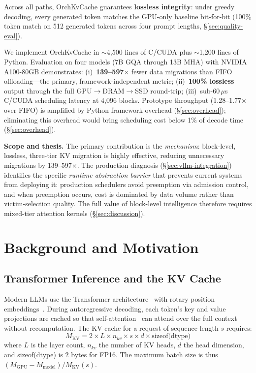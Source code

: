 \documentclass[conference]{IEEEtran}
\begin{document}
Across all paths, OrchKvCache guarantees \textbf{lossless integrity}: under greedy decoding, every generated token matches the GPU-only baseline bit-for-bit (100\% token match on 512 generated tokens across four prompt lengths, \S\ref{sec:quality-eval}).

We implement OrchKvCache in ${\sim}$4,500 lines of C/CUDA plus ${\sim}$1,200 lines of Python. Evaluation on four models (7B GQA through 13B MHA) with NVIDIA A100-80GB demonstrates: (i)~\textbf{139--597$\times$} fewer data migrations than FIFO offloading---the primary, framework-independent metric; (ii)~\textbf{100\% lossless} output through the full GPU$\to$DRAM$\to$SSD round-trip; (iii)~sub-60\,$\mu$s C/CUDA scheduling latency at 4,096 blocks. Prototype throughput (1.28--1.77$\times$ over FIFO) is amplified by Python framework overhead (\S\ref{sec:overhead}); eliminating this overhead would bring scheduling cost below 1\% of decode time (\S\ref{sec:overhead}).

\textbf{Scope and thesis.} The primary contribution is the \emph{mechanism}: block-level, lossless, three-tier KV migration is highly effective, reducing unnecessary migrations by 139--597$\times$. The production diagnosis (\S\ref{sec:vllm-integration}) identifies the specific \emph{runtime abstraction barrier} that prevents current systems from deploying it: production schedulers avoid preemption via admission control, and when preemption occurs, cost is dominated by data volume rather than victim-selection quality. The full value of block-level intelligence therefore requires mixed-tier attention kernels (\S\ref{sec:discussion}).

\section{Background and Motivation}
\subsection{Transformer Inference and the KV Cache}

Modern LLMs use the Transformer architecture~\cite{transformer} with rotary position embeddings~\cite{rope}. During autoregressive decoding, each token's key and value projections are cached so that self-attention~\cite{transformer} can attend over the full context without recomputation. The KV cache for a request of sequence length $s$ requires:
\begin{equation}
M_{\text{KV}} = 2 \times L \times n_{kv} \times s \times d \times \text{sizeof(dtype)}
\label{eq:kv-mem}
\end{equation}
where $L$ is the layer count, $n_{kv}$ the number of KV heads, $d$ the head dimension, and sizeof(dtype) is 2 bytes for FP16. The maximum batch size is thus $(M_{\text{GPU}} - M_{\text{model}}) / M_{\text{KV}}(s)$.
\end{document}
